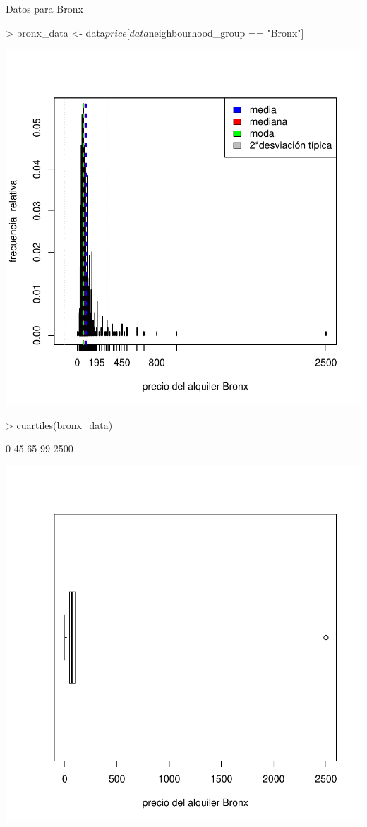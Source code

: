 \documentclass [a4paper] {article}
\begin{document}
Datos para Bronx
\begin{Schunk}
\begin{Sinput}
> bronx_data <- data$price[data$neighbourhood_group == "Bronx"]
\end{Sinput}
\end{Schunk}
\begin{center}
\includegraphics{entrega-bronx_data_plot}
\begin{Schunk}
\begin{Sinput}
> cuartiles(bronx_data)
\end{Sinput}
\begin{Soutput}
[1]    0   45   65   99 2500
\end{Soutput}
\end{Schunk}
\includegraphics{entrega-bronx_data_plot_c}
\end{center}
\end{document}
